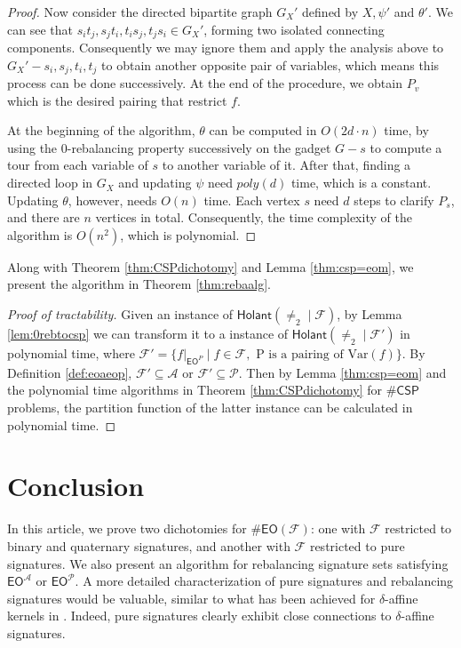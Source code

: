 \documentclass[a4paper,UKenglish,cleveref, autoref, thm-restate]{lipics-v2021}
\newcommand{\hol}[0]{\textsf{Holant}}
\newcommand{\eo}[0]{\textsf{EO}}
\newcommand{\csp}[0]{\textsf{CSP}}
\newcommand{\eom}[1][\text{M}]{\textsf{EO}^{#1}}
\begin{document}
\begin{proof}
Now consider the directed bipartite graph $G_X'$ defined by $X,\psi'$ and $\theta'$. We can see that $s_it_j,s_jt_i,t_is_j,t_js_i\in G_X'$, forming two isolated connecting components. Consequently we may ignore them and apply the analysis above to $G_X'-s_i,s_j,t_i,t_j$ to obtain another opposite pair of variables, which means this process can be done successively. At the end of the procedure, we obtain $P_v$ which is the desired pairing that restrict $f$.

At the beginning of the algorithm, $\theta$ can be computed in $O(2d\cdot n)$ time, by using the 0-rebalancing property successively on the gadget $G-s$ to compute a tour from each variable of $s$ to another variable of it. After that, finding a directed loop in $G_X$ and updating $\psi$ need $poly(d)$ time, which is a constant. Updating $\theta$, however, needs $O(n)$ time. Each vertex $s$ need $d$ steps to clarify $P_s$, and there are $n$ vertices in total. Consequently, the time complexity of the algorithm is $O(n^2)$, which is polynomial.
\end{proof}

Along with Theorem \ref{thm:CSPdichotomy} and Lemma \ref{thm:csp=eom}, we present the algorithm in Theorem \ref{thm:rebaalg}.

\begin{proof}[Proof of tractability]
Given an instance of $\hol(\neq_2\mid\mathcal{F})$, by Lemma \ref{lem:0rebtocsp} we can transform it to a instance of $\hol(\neq_2\mid\mathcal{F}')$ in polynomial time, where $\mathcal{F}'=\{f|_{\eom[P]}\mid f\in\mathcal{F},\text{ P is a pairing of Var}(f)\}$. By Definition \ref{def:eoaeop}, $\mathcal{F}'\subseteq\mathscr{A}$ or $\mathcal{F}'\subseteq\mathscr{P}$. Then by Lemma \ref{thm:csp=eom} and the polynomial time algorithms in Theorem \ref{thm:CSPdichotomy} for $\#\csp$ problems, the partition function of the latter instance can be calculated in polynomial time.
\end{proof}
\section{Conclusion}\label{sec:ccls}

In this article, we prove two dichotomies for $\#\eo(\mathcal{F})$: one with $\mathcal{F}$ restricted to binary and quaternary signatures, and another with $\mathcal{F}$ restricted to pure signatures. We also present an algorithm for rebalancing signature sets satisfying $\eom[\mathscr{A}]$ or $\eom[\mathscr{P}]$. A more detailed characterization of pure signatures and rebalancing signatures would be valuable, similar to what has been achieved for $\delta$-affine kernels in \cite{shao2024eulerian}. Indeed, pure signatures clearly exhibit close connections to $\delta$-affine signatures.
\end{document}
